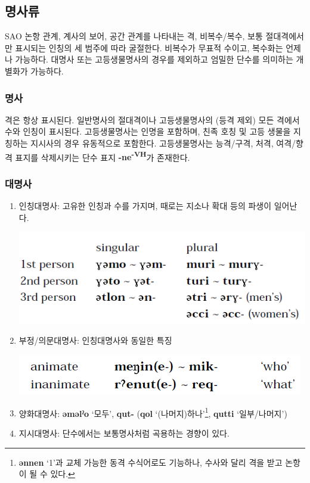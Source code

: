 \subsection{명사류}
SAO 논항 관계, 계사의 보어, 공간 관계를 나타내는 격, 비복수/복수, 보통 절대격에서만 표시되는 인칭의 세 범주에 따라 굴절한다. 비복수가 무표적 수이고, 복수화는 언제나 가능하다. 대명사 또는 고등생물명사의 경우를 제외하고 엄밀한 단수를 의미하는 개별화가 가능하다.
\subsubsection{명사}
격은 항상 표시된다. 일반명사의 절대격이나 고등생물명사의 (등격 제외) 모든 격에서 수와 인칭이 표시된다. 고등생물명사는 인명을 포함하며, 친족 호칭 및 고등 생물을 지칭하는 지시사의 경우 유동적으로 포함한다. 고등생물명사는 능격/구격, 처격, 여격/향격 표지를 삭제시키는 단수 표지 \textbf{-ne\textsuperscript{-VH}}가 존재한다.
\subsubsection{대명사}
\begin{enumerate}
	\item 인칭대명사: 고유한 인칭과 수를 가지며, 때로는 지소나 확대 등의 파생이 일어난다.
	\begin{center}
	\includegraphics{Chukchi/src/chpr.png}
	\end{center}
	\item 부정/의문대명사: 인칭대명사와 동일한 특징
	\begin{center}
	\includegraphics{Chukchi/src/chin.png}
	\end{center}
	\item 양화대명사: \textbf{əməlˀo} `모두’, \textbf{qut-} (\textbf{qol} `(나머지)하나’\footnote{\textbf{ənnen} `1’과 교체 가능한 동격 수식어로도 기능하나, 수사와 달리 격을 받고 논항이 될 수 있다.}, \textbf{qutti} `일부/나머지’)
	\item 지시대명사: 단수에서는 보통명사처럼 곡용하는 경향이 있다.
	\end{enumerate}
